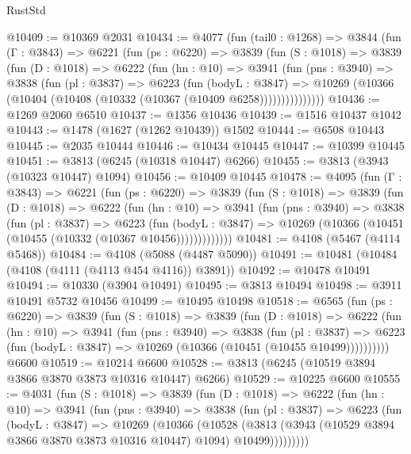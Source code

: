 \begin{lexlean}{RustStd}
\begin{coremodule}
{\begin{coremodule}
{{{{{{{{{{{{{{{{{{{{{{{{{{{{{{{{{{{@10409 := @10369 @2031
@10434 := @4077
    (fun (tail0 : @1268) =>
    @3844
      (fun (Γ : @3843) =>
      @6221
        (fun (ps : @6220) =>
        @3839
          (fun (S : @1018) =>
          @3839
            (fun (D : @1018) =>
            @6222
              (fun (hn : @10) =>
              @3941
                (fun (pns : @3940) =>
                @3838
                  (fun (pl : @3837) =>
                  @6223
                    (fun (bodyL : @3847) =>
                    @10269 (@10366 (@10404 (@10408 (@10332 (@10367 (@10409 @6258)))))))))))))))
@10436 := @1269 @2060 @6510
@10437 := @1356 @10436
@10439 := @1516 @10437 @1042
@10443 := @1478 (@1627 (@1262 @10439)) @1502
@10444 := @6508 @10443
@10445 := @2035 @10444
@10446 := @10434 @10445
@10447 := @10399 @10445
@10451 := @3813 (@6245 (@10318 @10447) @6266)
@10455 := @3813 (@3943 (@10323 @10447) @1094)
@10456 := @10409 @10445
@10478 := @4095
    (fun (Γ : @3843) =>
    @6221
      (fun (ps : @6220) =>
      @3839
        (fun (S : @1018) =>
        @3839
          (fun (D : @1018) =>
          @6222
            (fun (hn : @10) =>
            @3941
              (fun (pns : @3940) =>
              @3838
                (fun (pl : @3837) =>
                @6223
                  (fun (bodyL : @3847) =>
                  @10269 (@10366 (@10451 (@10455 (@10332 (@10367 @10456)))))))))))))
@10481 := @4108 (@5467 (@4114 @5468))
@10484 := @4108 (@5088 (@4487 @5090))
@10491 := @10481 (@10484 (@4108 (@4111 (@4113 @454 @4116)) @3891))
@10492 := @10478 @10491
@10494 := @10330 (@3904 @10491)
@10495 := @3813 @10494
@10498 := @3911 @10491 @5732 @10456
@10499 := @10495 @10498
@10518 := @6565
    (fun (ps : @6220) =>
    @3839
      (fun (S : @1018) =>
      @3839
        (fun (D : @1018) =>
        @6222
          (fun (hn : @10) =>
          @3941
            (fun (pns : @3940) =>
            @3838
              (fun (pl : @3837) =>
              @6223 (fun (bodyL : @3847) => @10269 (@10366 (@10451 (@10455 @10499))))))))))
    @6600
@10519 := @10214 @6600
@10528 := @3813 (@6245 (@10519 @3894 @3866 @3870 @3873 @10316 @10447) @6266)
@10529 := @10225 @6600
@10555 := @4031
    (fun (S : @1018) =>
    @3839
      (fun (D : @1018) =>
      @6222
        (fun (hn : @10) =>
        @3941
          (fun (pns : @3940) =>
          @3838
            (fun (pl : @3837) =>
            @6223
              (fun (bodyL : @3847) =>
              @10269
                (@10366
                  (@10528
                    (@3813
                      (@3943 (@10529 @3894 @3866 @3870 @3873 @10316 @10447) @1094)
                      @10499)))))))))
}}}}}}}}}}}}}}}}}}}}}}}}}}}}}}}}}}}
\end{coremodule}}
\end{coremodule}
\end{lexlean}
